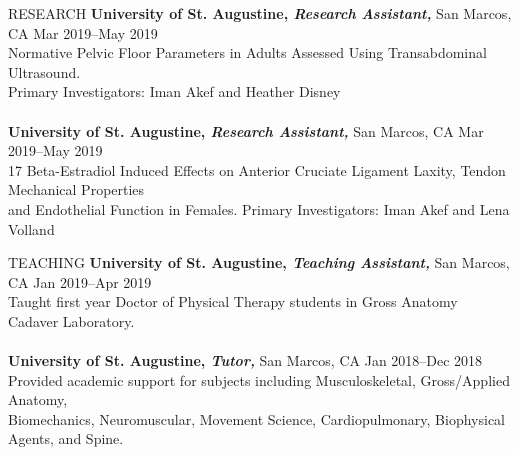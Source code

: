 \documentclass{resume} %
\begin{document}
\begin{rSection}{RESEARCH}
{\textbf{University of St. Augustine, \textit{Research Assistant,}} San Marcos, CA \hfill Mar 2019--May 2019 \\
Normative Pelvic Floor Parameters in Adults Assessed Using Transabdominal Ultrasound. \\Primary Investigators: Iman Akef and Heather Disney}
\\\\
{\textbf{University of St. Augustine, \textit{Research Assistant,}} San Marcos, CA \hfill Mar 2019--May 2019 \\
17 Beta-Estradiol Induced Effects on Anterior Cruciate Ligament Laxity, Tendon Mechanical Properties \\and Endothelial Function in Females. Primary Investigators: Iman Akef and Lena Volland}
\end{rSection} 
\begin{rSection}{TEACHING}
{\textbf{University of St. Augustine, \textit{Teaching Assistant,}} San Marcos, CA \hfill Jan 2019--Apr 2019 \\
Taught first year Doctor of Physical Therapy students in Gross Anatomy Cadaver Laboratory.}
\\\\
{\textbf{University of St. Augustine, \textit{Tutor,}} San Marcos, CA \hfill Jan 2018--Dec 2018 \\
Provided academic support for subjects including Musculoskeletal, Gross/Applied Anatomy, \\Biomechanics, Neuromuscular, Movement Science, Cardiopulmonary, Biophysical Agents, and Spine.}
\end{rSection} 
\end{document}
